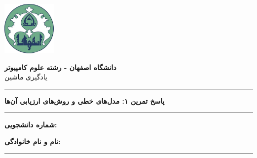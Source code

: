 \begin{center}
	\includegraphics[width=75pt, height=75pt]{./images/isf_uni_logo.png}
\end{center}

\begin{center}
	\begin{minipage}{\textwidth}
		\begin{center}
			\textbf{\Large دانشگاه اصفهان - رشته علوم کامپیوتر \\}
			\Large {یادگیری ماشین}
		\end{center}
		\hrule
		\begin{center}
			\textbf{\huge {پاسخ تمرین ۱: مدل‌های خطی و روش‌های ارزیابی آن‌ها }}
		\end{center}
		\hrule
	\end{minipage}
\end{center}

\begin{flushright}
	\textbf{\large شماره دانشجویی:}
\end{flushright}
\begin{flushright}
	\textbf{\large نام و نام خانوادگی:}
\end{flushright}
\hrule
\vspace{\baselineskip}
\vspace{\baselineskip}